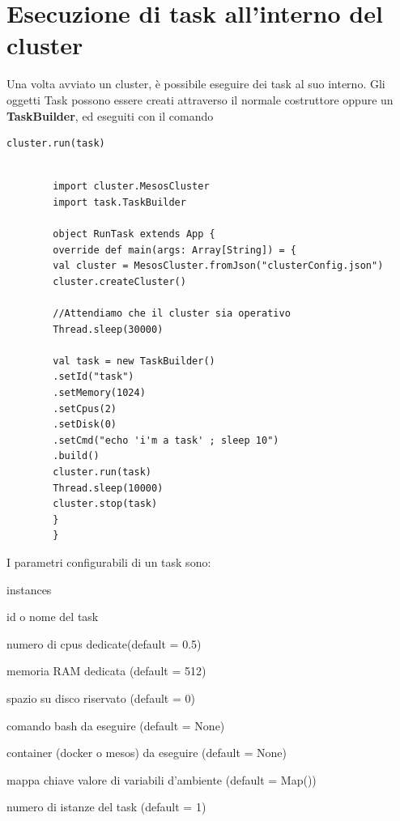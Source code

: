 \documentclass[12pt,a4paper]{article}
\begin{document}
    \section{Esecuzione di task all'interno del cluster}\label{sec:esecuzioneTask}
    Una volta avviato un cluster, \`e possibile eseguire dei task al suo interno.
    Gli oggetti Task possono essere creati attraverso il normale costruttore oppure un \textbf{TaskBuilder}, ed eseguiti con il comando
    \begin{lstlisting}[style=myScalastyle]
        cluster.run(task)
    \end{lstlisting}
    \begin{lstlisting}[style=myScalastyle]

        import cluster.MesosCluster
        import task.TaskBuilder

        object RunTask extends App {
        override def main(args: Array[String]) = {
        val cluster = MesosCluster.fromJson("clusterConfig.json")
        cluster.createCluster()

        //Attendiamo che il cluster sia operativo
        Thread.sleep(30000)

        val task = new TaskBuilder()
        .setId("task")
        .setMemory(1024)
        .setCpus(2)
        .setDisk(0)
        .setCmd("echo 'i'm a task' ; sleep 10")
        .build()
        cluster.run(task)
        Thread.sleep(10000)
        cluster.stop(task)
        }
        }
    \end{lstlisting}
    I parametri configurabili di un task sono:
    \begin{labeling}{instances}
        \item[id]
        id o nome del task
        \item [cpus]
        numero di cpus dedicate(default = 0.5)
        \item [memory]
        memoria RAM dedicata (default = 512)
        \item [disk]
        spazio su disco riservato (default = 0)
        \item [cmd]
        comando bash da eseguire (default = None)
        \item [container]
        container (docker o mesos) da eseguire (default = None)
        \item [env]
        mappa chiave valore di variabili d'ambiente (default = Map())
        \item [instances]
        numero di istanze del task (default = 1)
    \end{labeling}
\end{document}
